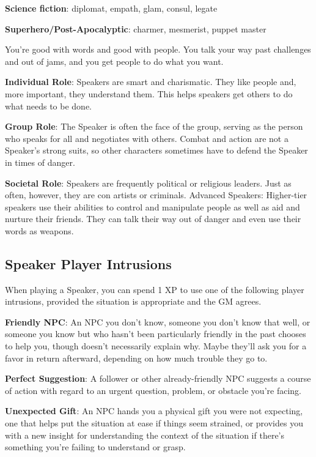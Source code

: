 \begin{multicols}{2}
\textbf{Science fiction}: diplomat, empath, glam, consul, legate

\textbf{Superhero/Post-Apocalyptic}: charmer, mesmerist, puppet master

You’re good with words and good with people. You talk your way past challenges and out of jams, and you get people to do what you want.

\textbf{Individual Role}: Speakers are smart and charismatic. They like people and, more important, they understand them. This helps speakers get others to do what needs to be done. 

\textbf{Group Role}: The Speaker is often the face of the group, serving as the person who speaks for all and negotiates with others. Combat and action are not a Speaker’s strong suits, so other characters sometimes have to defend the Speaker in times of danger.

\textbf{Societal Role}: Speakers are frequently political or religious leaders. Just as often, however, they are con artists or criminals. 
Advanced Speakers: Higher-tier speakers use their abilities to control and manipulate people as well as aid and nurture their friends. They can talk their way out of danger and even use their words as weapons.

\subsection{Speaker Player Intrusions}

When playing a Speaker, you can spend 1 XP to use one of the following player intrusions, provided the situation is appropriate and the GM agrees.

\textbf{Friendly NPC}: An NPC you don’t know, someone you don’t know that well, or someone you know but who hasn’t been particularly friendly in the past chooses to help you, though doesn’t necessarily explain why. Maybe they’ll ask you for a favor in return afterward, depending on how much trouble they go to.

\textbf{Perfect Suggestion}: A follower or other already-friendly NPC suggests a course of action with regard to an urgent question, problem, or obstacle you’re facing.

\textbf{Unexpected Gift}: An NPC hands you a physical gift you were not expecting, one that helps put the situation at ease if things seem strained, or provides you with a new insight for understanding the context of the situation if there’s something you’re failing to understand or grasp.


\end{multicols}
